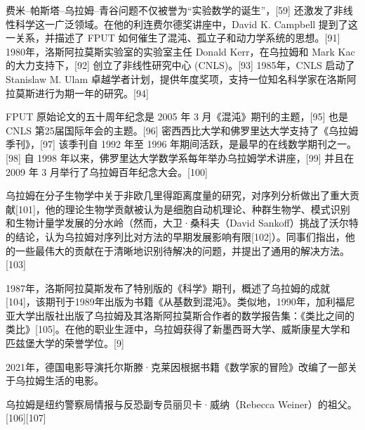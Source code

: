 费米–帕斯塔–乌拉姆–青谷问题不仅被誉为“实验数学的诞生”，[59] 还激发了非线性科学这一广泛领域。在他的利连费尔德奖讲座中，David K. Campbell 提到了这一关系，并描述了 FPUT 如何催生了混沌、孤立子和动力学系统的思想。[91] 1980年，洛斯阿拉莫斯实验室的实验室主任 Donald Kerr，在乌拉姆和 Mark Kac 的大力支持下，[92] 创立了非线性研究中心 (CNLS)。[93] 1985年，CNLS 启动了 Stanislaw M. Ulam 卓越学者计划，提供年度奖项，支持一位知名科学家在洛斯阿拉莫斯进行为期一年的研究。[94]

FPUT 原始论文的五十周年纪念是 2005 年 3 月《混沌》期刊的主题，[95] 也是 CNLS 第25届国际年会的主题。[96] 密西西比大学和佛罗里达大学支持了《乌拉姆季刊》，[97] 该季刊自 1992 年至 1996 年期间活跃，是最早的在线数学期刊之一。[98] 自 1998 年以来，佛罗里达大学数学系每年举办乌拉姆学术讲座，[99] 并且在 2009 年 3 月举行了乌拉姆百年纪念大会。[100]

乌拉姆在分子生物学中关于非欧几里得距离度量的研究，对序列分析做出了重大贡献[101]，他的理论生物学贡献被认为是细胞自动机理论、种群生物学、模式识别和生物计量学发展的分水岭（然而，大卫·桑科夫（David Sankoff）挑战了沃尔特的结论，认为乌拉姆对序列比对方法的早期发展影响有限[102]）。同事们指出，他的一些最伟大的贡献在于清晰地识别待解决的问题，并提出了通用的解决方法。[103]

1987年，洛斯阿拉莫斯发布了特别版的《科学》期刊，概述了乌拉姆的成就[104]，该期刊于1989年出版为书籍《从基数到混沌》。类似地，1990年，加利福尼亚大学出版社出版了乌拉姆及其洛斯阿拉莫斯合作者的数学报告集：《类比之间的类比》[105]。在他的职业生涯中，乌拉姆获得了新墨西哥大学、威斯康星大学和匹兹堡大学的荣誉学位。[9]

2021年，德国电影导演托尔斯滕·克莱因根据书籍《数学家的冒险》改编了一部关于乌拉姆生活的电影。

乌拉姆是纽约警察局情报与反恐副专员丽贝卡·威纳（Rebecca Weiner）的祖父。[106][107]
